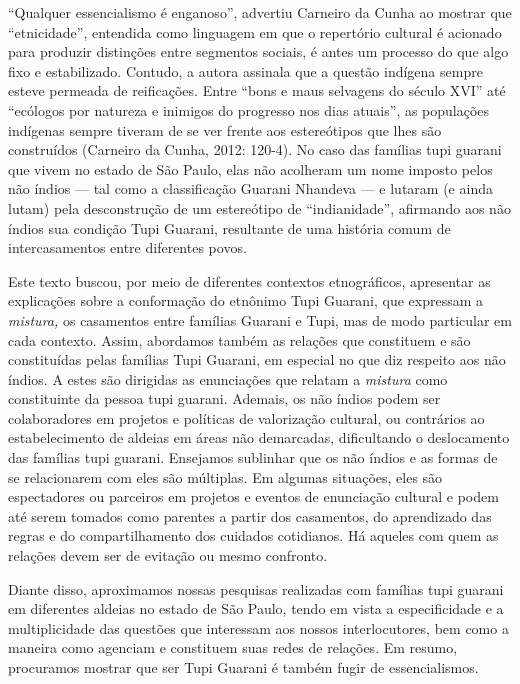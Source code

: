 ``Qualquer essencialismo é enganoso'', advertiu Carneiro da Cunha ao
mostrar que ``etnicidade'', entendida como linguagem em que o repertório
cultural é acionado para produzir distinções entre segmentos sociais, é
antes um processo do que algo fixo e estabilizado. Contudo, a autora
assinala que a questão indígena sempre esteve permeada de reificações.
Entre ``bons e maus selvagens do século XVI'' até ``ecólogos por
natureza e inimigos do progresso nos dias atuais'', as populações
indígenas sempre tiveram de se ver frente aos estereótipos que lhes são
construídos (Carneiro da Cunha, 2012: 120-4). No caso das famílias tupi
guarani que vivem no estado de São Paulo, elas não acolheram um nome
imposto pelos não índios --- tal como a classificação Guarani Nhandeva
--- e lutaram (e ainda lutam) pela desconstrução de um estereótipo de
``indianidade'', afirmando aos não índios sua condição Tupi Guarani,
resultante de uma história comum de intercasamentos entre diferentes
povos.

Este texto buscou, por meio de diferentes contextos etnográficos,
apresentar as explicações sobre a conformação do etnônimo Tupi Guarani,
que expressam a \emph{mistura,} os casamentos entre famílias Guarani e
Tupi, mas de modo particular em cada contexto. Assim, abordamos também
as relações que constituem e são constituídas pelas famílias Tupi
Guarani, em especial no que diz respeito aos não índios. A estes são
dirigidas as enunciações que relatam a \emph{mistura} como constituinte
da pessoa tupi guarani. Ademais, os não índios podem ser colaboradores
em projetos e políticas de valorização cultural, ou contrários ao
estabelecimento de aldeias em áreas não demarcadas, dificultando o
deslocamento das famílias tupi guarani. Ensejamos sublinhar que os não
índios e as formas de se relacionarem com eles são múltiplas. Em algumas
situações, eles são espectadores ou parceiros em projetos e eventos de
enunciação cultural e podem até serem tomados como parentes a partir dos
casamentos, do aprendizado das regras e do compartilhamento dos cuidados
cotidianos. Há aqueles com quem as relações devem ser de evitação ou
mesmo confronto.

Diante disso, aproximamos nossas pesquisas realizadas com famílias tupi
guarani em diferentes aldeias no estado de São Paulo, tendo em vista a
especificidade e a multiplicidade das questões que interessam aos nossos
interlocutores, bem como a maneira como agenciam e constituem suas redes
de relações. Em resumo, procuramos mostrar que ser Tupi Guarani é também
fugir de essencialismos.

